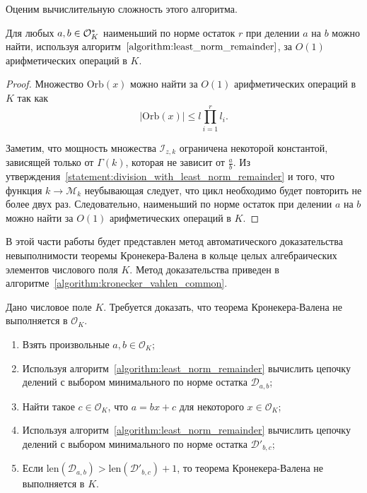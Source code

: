 \documentclass[_00_dissertation.tex]{subfiles}
\begin{document}
Оценим вычислительную сложность этого алгоритма.

\begin{proposition}
    Для любых $a, b \in \mathcal{O}_K^{*}$ наименьший по норме остаток $r$ при делении $a$ на $b$ можно найти, используя алгоритм~$\ref{algorithm:least_norm_remainder}$, за $O(1)$ арифметических операций в $K$.
\end{proposition}
\begin{proof}
    Множество $\textrm{Orb}(x)$ можно найти за $O(1)$ арифметических операций в $K$ так как
    \begin{equation*}
        |\textrm{Orb}(x)| \le l\prod\limits_{i=1}^r l_i.
    \end{equation*}

    Заметим, что мощность множества $\mathcal{I}_{z, k}$ ограничена некоторой константой, зависящей только от $\Gamma(k)$, которая не зависит от $\frac{a}{b}$.
    Из утверждения~\ref{statement:division_with_least_norm_remainder} и того, что функция $k \to \mathcal{M}_k$ неубывающая следует, что цикл необходимо будет повторить не более двух раз.
    Следовательно, наименьший по норме остаток при делении $a$ на $b$ можно найти за $O(1)$ арифметических операций в $K$.
\end{proof}


В этой части работы будет представлен метод автоматического доказательства невыполнимости теоремы Кронекера-Валена в кольце целых алгебраических элементов числового поля $K$.
Метод доказательства приведен в алгоритме~\ref{algorithm:kronecker_vahlen_common}.

\begin{algorithm}\label{algorithm:kronecker_vahlen_common}
    Дано числовое поле $K$.
    Требуется доказать, что теорема Кронекера-Валена не выполняется в $\mathcal{O}_K$.
    
    \begin{enumerate}
        \item Взять произвольные $a, b \in \mathcal{O}_K$;

        \item Используя алгоритм~\ref{algorithm:least_norm_remainder} вычислить цепочку делений с выбором минимального по норме остатка $\mathcal{D}_{a, b}$;

        \item Найти такое $c \in \mathcal{O}_K$, что $a = bx + c$ для некоторого $x \in \mathcal{O}_K$;

        \item Используя алгоритм~\ref{algorithm:least_norm_remainder} вычислить цепочку делений с выбором минимального по норме остатка $\mathcal{D}'_{b,c}$;

        \item Если $\textrm{len}(\mathcal{D}_{a, b}) > \textrm{len}(\mathcal{D}'_{b, c}) + 1$, то теорема Кронекера-Валена не выполняется в $K$.
    \end{enumerate}
\end{algorithm}
\end{document}
